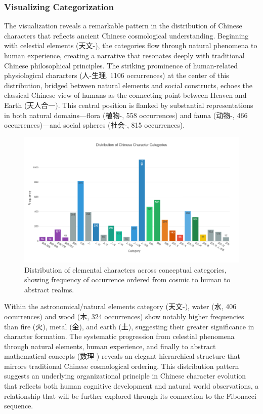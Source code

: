 \subsubsection{Visualizing
Categorization}\label{visualizing-categorization}

The visualization reveals a remarkable pattern in the distribution of
Chinese characters that reflects ancient Chinese cosmological
understanding. Beginning with celestial elements (天文-), the categories
flow through natural phenomena to human experience, creating a narrative
that resonates deeply with traditional Chinese philosophical principles.
The striking prominence of human-related physiological characters
(人-生理, 1106 occurrences) at the center of this distribution, bridged
between natural elements and social constructs, echoes the classical
Chinese view of humans as the connecting point between Heaven and Earth
(天人合一). This central position is flanked by substantial
representations in both natural domains---flora (植物-, 558 occurrences)
and fauna (动物-, 466 occurrences)---and social spheres (社会-, 815
occurrences).

\begin{figure}
\centering
\includegraphics{./images/zi_category_histogram.png}
\caption{Distribution of elemental characters across conceptual
categories, showing frequency of occurrence ordered from cosmic to human
to abstract realms.}
\end{figure}

Within the astronomical/natural elements category (天文-), water (水,
406 occurrences) and wood (木, 324 occurrences) show notably higher
frequencies than fire (火), metal (金), and earth (土), suggesting their
greater significance in character formation. The systematic progression
from celestial phenomena through natural elements, human experience, and
finally to abstract mathematical concepts (数理-) reveals an elegant
hierarchical structure that mirrors traditional Chinese cosmological
ordering. This distribution pattern suggests an underlying
organizational principle in Chinese character evolution that reflects
both human cognitive development and natural world observations, a
relationship that will be further explored through its connection to the
Fibonacci sequence.

